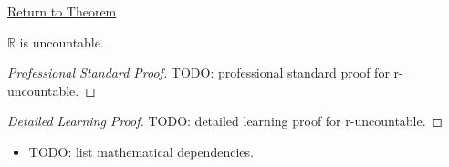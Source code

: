 \newpage
{}
\label{prf:r-uncountable}

\begin{remark*}[Return]
\hyperref[prop:r-uncountable]{Return to Theorem}
\end{remark*}

\begin{theorem*}[r-uncountable]
$\mathbb{R}$ is uncountable.
\end{theorem*}

\begin{proof}[Professional Standard Proof]
\LRAProofBodyStart
TODO: professional standard proof for r-uncountable.
\end{proof}

\begin{proof}[Detailed Learning Proof]
\LRAProofBodyStart
TODO: detailed learning proof for r-uncountable.
\end{proof}

\begin{remark*}
\end{remark*}

\begin{dependencies}
\begin{itemize}
  \item TODO: list mathematical dependencies.
\end{itemize}
\end{dependencies}

\clearpage
